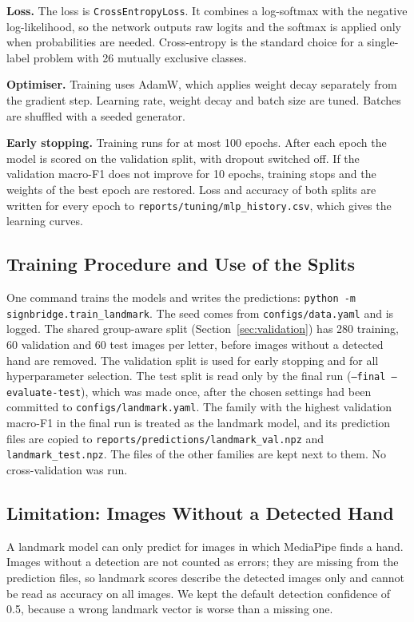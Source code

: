 \textbf{Loss.} The loss is \texttt{CrossEntropyLoss}. It combines a log-softmax with the negative log-likelihood, so the network outputs raw logits and the softmax is applied only when probabilities are needed. Cross-entropy is the standard choice for a single-label problem with 26 mutually exclusive classes.

\textbf{Optimiser.} Training uses AdamW, which applies weight decay separately from the gradient step. Learning rate, weight decay and batch size are tuned. Batches are shuffled with a seeded generator.

\textbf{Early stopping.} Training runs for at most 100 epochs. After each epoch the model is scored on the validation split, with dropout switched off. If the validation macro-F1 does not improve for 10 epochs, training stops and the weights of the best epoch are restored. Loss and accuracy of both splits are written for every epoch to \texttt{reports/tuning/mlp\_history.csv}, which gives the learning curves.

\subsection{Training Procedure and Use of the Splits}

One command trains the models and writes the predictions: \texttt{python -m signbridge.train\_landmark}. The seed comes from \texttt{configs/data.yaml} and is logged. The shared group-aware split (Section~\ref{sec:validation}) has 280 training, 60 validation and 60 test images per letter, before images without a detected hand are removed. The validation split is used for early stopping and for all hyperparameter selection. The test split is read only by the final run (\texttt{--final --evaluate-test}), which was made once, after the chosen settings had been committed to \texttt{configs/landmark.yaml}. The family with the highest validation macro-F1 in the final run is treated as the landmark model, and its prediction files are copied to \texttt{reports/predictions/landmark\_val.npz} and \texttt{landmark\_test.npz}. The files of the other families are kept next to them. No cross-validation was run.

\subsection{Limitation: Images Without a Detected Hand}

A landmark model can only predict for images in which MediaPipe finds a hand. Images without a detection are not counted as errors; they are missing from the prediction files, so landmark scores describe the detected images only and cannot be read as accuracy on all images. We kept the default detection confidence of 0.5, because a wrong landmark vector is worse than a missing one.

